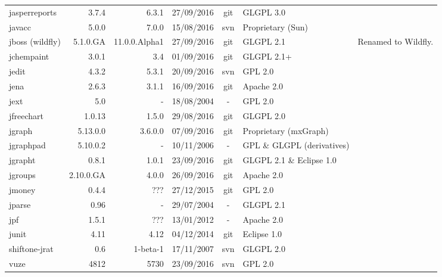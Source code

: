 \documentclass{sig-alternate-05-2015}
\begin{document}
\begin{table}
\begin{tabular}{l|r|r|c|c|p{3cm}|p{3cm}}
			jasperreports & 3.7.4 & 6.3.1 & 27/09/2016 & git & GLGPL 3.0 &  \\
			javacc & 5.0.0 & 7.0.0 & 15/08/2016 & svn & Proprietary (Sun) & \\
			jboss (wildfly) & 5.1.0.GA & 11.0.0.Alpha1 & 27/09/2016 & git & GLGPL 2.1 & Renamed to Wildfly. \\
			jchempaint & 3.0.1 & 3.4 & 01/09/2016 & git & GLGPL 2.1+ &  \\
			jedit & 4.3.2 & 5.3.1 & 20/09/2016 & svn & GPL 2.0 &  \\
			jena & 2.6.3 & 3.1.1 & 16/09/2016 & git & Apache 2.0 & \\
			jext & 5.0 & - & 18/08/2004 & - & GPL 2.0 &  \\
			jfreechart & 1.0.13 & 1.5.0 & 29/08/2016 & git & GLGPL 2.0 &   \\
			jgraph & 5.13.0.0 & 3.6.0.0 & 07/09/2016 & git & Proprietary (mxGraph) & \\
			jgraphpad & 5.10.0.2 & - & 10/11/2006 & - & GPL   \& GLGPL (derivatives) & \\
			jgrapht & 0.8.1 & 1.0.1 & 23/09/2016 & git & GLGPL 2.1 \& Eclipse  1.0 & \\
			jgroups & 2.10.0.GA & 4.0.0 & 26/09/2016 & git & Apache 2.0 & \\
			jmoney & 0.4.4 & ??? & 27/12/2015 & git & GPL 2.0 &  \\
			jparse & 0.96 & - & 29/07/2004 & - & GLGPL 2.1 & \\
			jpf & 1.5.1 & ??? & 13/01/2012 & - & Apache 2.0 & \\
			junit & 4.11 & 4.12 & 04/12/2014 & git & Eclipse  1.0 & \\
			shiftone-jrat & 0.6 & 1-beta-1 & 17/11/2007 & svn & GLGPL 2.0 &  \\
			vuze & 4812 & 5730 & 23/09/2016 & svn & GPL 2.0 & \\
			\hline
		\end{tabular} %
\end{table}
			
\end{document}
